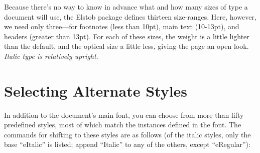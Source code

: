 \documentclass[12pt]{article}
\begin{document}
\noindent Because there's no way to know in advance what and how many sizes of type a document
will use, the Elstob package defines thirteen size-ranges. Here, however, we
need only three---for footnotes (less than 10pt),
main text (10-13pt), and headers (greater than 13pt). For each of these sizes, the
weight is a little lighter than the default, and the optical size a little less, giving
the page an open look. \textit{Italic type is relatively upright}.

\section{Selecting Alternate Styles}

In addition to the document's main font, you can choose from more than fifty
predefined styles, most of which match the instances defined in the font.
The commands for shifting to these
styles are as follows (of the italic styles, only the base “eItalic” is listed;
append “Italic” to any of the others, except “eRegular”):
\end{document}
